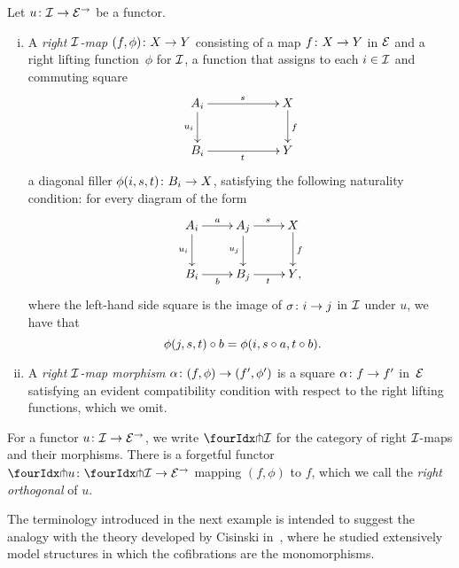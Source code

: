 \documentclass[reqno,10pt,a4paper,oneside]{amsart}
\begin{document}
\begin{definition} \label{def:right-map}
Let $u \co \cal{I} \to \catE^\to$ be a functor.
\begin{enumerate}[(i)]
\item A \emph{right $\cal{I}$-map} $(f, \phi) \co X \to Y$ consisting of a map $f \co X \to Y$ in $\cal{E}$ and a right lifting function~$\phi$ for $\cal{I}$, \ie a function that assigns to each $i \in \cal{I}$ and commuting square
\[
\xymatrix@C=2cm{
A_i \ar[r]^{s} \ar[d]_{u_i} & X \ar[d]^f \\
B_i \ar[r]_{t} & Y}
\]
a diagonal filler $\phi(i,s, t) \co B_i \to X$, satisfying the following naturality condition: for every diagram of the form
\[
\xymatrix{
A_i \ar[r]^a \ar[d]_{u_i} & A_j \ar[r]^{s} \ar[d]_{u_j} & X \ar[d]^f \\
B_i \ar[r]_{b} & B_j \ar[r]_{t} & Y \rlap{,}}
\]
where the left-hand side square is the image of $\sigma \co i \to j$ in $\cal{I}$ under $u$, we have that
\[
\phi(j, s, t) \cc b = \phi(i, s \cc a, t \cc b) \rlap{.}
\]
\item A \emph{right $\cal{I}$-map morphism} $\alpha \co (f, \phi) \to (f', \phi')$ is a square $\alpha \co f \to f'$ in~$\catE$ satisfying an evident compatibility condition with respect to the right lifting functions, which we omit.
\end{enumerate}
\end{definition}

For a functor $u \co \cal{I} \to \catE^\to$, we write $\liftr{\cal{I}}$ for the category of right $\cal{I}$-maps and their morphisms.
There is a forgetful functor~$\liftr{u} \co \liftr{\cal{I}} \to \catE^\to$ mapping $(f, \phi)$ to $f$, which we call the \emph{right orthogonal} of $u$.

The terminology introduced in the next example is intended to suggest the analogy with the theory developed by Cisinski in~\cite{cisinski-asterisque}, where he studied extensively model structures in which the cofibrations are the monomorphisms.
\end{document}
